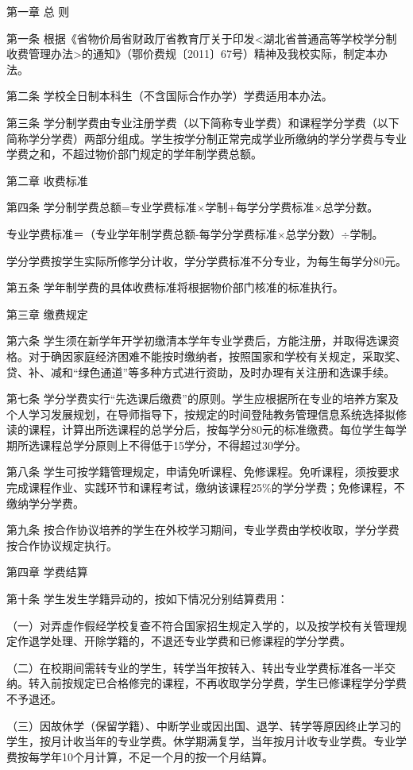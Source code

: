 \documentclass[UTF8,12pt,a4paper]{report}
\begin{document}
第一章 总 则

第一条 根据《省物价局省财政厅省教育厅关于印发<湖北省普通高等学校学分制收费管理办法>的通知》（鄂价费规〔2011〕67号）精神及我校实际，制定本办法。

第二条 学校全日制本科生（不含国际合作办学）学费适用本办法。

第三条 学分制学费由专业注册学费（以下简称专业学费）和课程学分学费（以下简称学分学费）两部分组成。学生按学分制正常完成学业所缴纳的学分学费与专业学费之和，不超过物价部门规定的学年制学费总额。

第二章 收费标准

第四条 学分制学费总额=专业学费标准$\times$学制+每学分学费标准$\times$总学分数。

专业学费标准＝（专业学年制学费总额-每学分学费标准$\times$总学分数）$\div$学制。

学分学费按学生实际所修学分计收，学分学费标准不分专业，为每生每学分80元。

第五条 学年制学费的具体收费标准将根据物价部门核准的标准执行。

第三章 缴费规定

第六条 学生须在新学年开学初缴清本学年专业学费后，方能注册，并取得选课资格。对于确因家庭经济困难不能按时缴纳者，按照国家和学校有关规定，采取奖、贷、补、减和“绿色通道”等多种方式进行资助，及时办理有关注册和选课手续。

第七条 学分学费实行“先选课后缴费”的原则。学生应根据所在专业的培养方案及个人学习发展规划，在导师指导下，按规定的时间登陆教务管理信息系统选择拟修读的课程，计算出所选课程的总学分后，按每学分80元的标准缴费。每位学生每学期所选课程总学分原则上不得低于15学分，不得超过30学分。

第八条 学生可按学籍管理规定，申请免听课程、免修课程。免听课程，须按要求完成课程作业、实践环节和课程考试，缴纳该课程25\%的学分学费；免修课程，不缴纳学分学费。

第九条 按合作协议培养的学生在外校学习期间，专业学费由学校收取，学分学费按合作协议规定执行。

第四章  学费结算

第十条 学生发生学籍异动的，按如下情况分别结算费用：

（一）对弄虚作假经学校复查不符合国家招生规定入学的，以及按学校有关管理规定作退学处理、开除学籍的，不退还专业学费和已修课程的学分学费。

（二）在校期间需转专业的学生，转学当年按转入、转出专业学费标准各一半交纳。转入前按规定已合格修完的课程，不再收取学分学费，学生已修课程学分学费不予退还。

（三）因故休学（保留学籍）、中断学业或因出国、退学、转学等原因终止学习的学生，按月计收当年的专业学费。休学期满复学，当年按月计收专业学费。专业学费按每学年10个月计算，不足一个月的按一个月结算。
\end{document}
